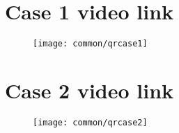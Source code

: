 \begin{appendices}

\section{Case 1 video link}

\begin{figure}[ht]
	\centering
	\texttt{[image: common/qrcase1]}
\end{figure}

\section{Case 2 video link}

\begin{figure}[ht]
	\centering
	\texttt{[image: common/qrcase2]}
\end{figure}

\end{appendices}
